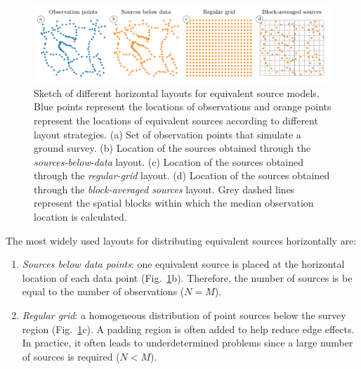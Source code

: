 \documentclass[twocolumn]{article}
\begin{document}
\begin{figure}
    \includegraphics[width=\linewidth]{figs/source-layouts-schematics.pdf}
    \caption{
        Sketch of different horizontal layouts for equivalent source models.
        Blue points represent the locations of observations and orange points
        represent the locations of equivalent sources according to different
        layout strategies.
        (a) Set of \SourceLayoutsSchematicsObservations{} observation points
        that simulate a ground survey.
        (b) Location of the \SourceLayoutsSchematicsSourceBelowData{} sources
        obtained through the \emph{sources-below-data} layout.
        (c) Location of the \SourceLayoutsSchematicsGridSources{} sources
        obtained through the \emph{regular-grid} layout.
        (d) Location of the \SourceLayoutsSchematicsBlockAveragedSources{}
        sources obtained through the \emph{block-averaged sources} layout.
        Grey dashed lines represent the spatial blocks within which the median
        observation location is calculated.
    }
    \label{fig:source_layouts}
\end{figure}

The most widely used layouts for distributing equivalent sources horizontally
are:

\begin{enumerate}
  \item
    \emph{Sources below data points}: one equivalent source is placed at the
    horizontal location of each data point (Fig.~\ref{fig:source_layouts}b).
    Therefore, the number of sources is be equal to the number of observations
    ($N=M$).
  \item
    \emph{Regular grid}: a homogeneous distribution of point sources below the
    survey region (Fig.~\ref{fig:source_layouts}c). A padding region is often
    added to help reduce edge effects. In practice, it often leads to
    underdetermined problems since a large number of sources is required
    ($N<M$).
\end{enumerate}
\end{document}
